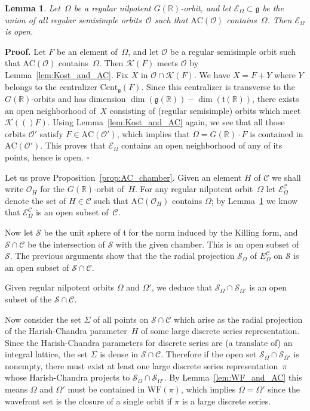 \documentclass[10pt,leqno]{article}
\newtheorem{lemma}[equation]{Lemma}
\newcommand{\qed}{\hfill $\square$ \medskip}
\newenvironment{proof}[1][Proof]{\noindent\textbf{#1.} }{\qed}
\newcommand{\R}{\mathbb R}
\renewcommand{\t}{\mathfrak t}
\newcommand{\g}{\mathfrak g}
\newcommand{\WF}{\mathrm{WF}}
\newcommand{\AC}{\mathrm{AC}}
\newcommand{\Kostant}[1]{\mathcal{K}(#1)}
\newcommand{\ECom}{\mathcal{E}^{\mathcal{C}}_\Omega}
\begin{document}
\begin{lemma}\label{lem:AC_containment} Let~$\Omega$ be a regular nilpotent $G(\R)$-orbit, and let $\mathcal{E}_\Omega \subset \g$ be the union of all regular semisimple orbits~$\mathcal{O}$ such that $\AC(\mathcal{O})$ contains~$\Omega$. Then $\mathcal{E}_\Omega$ is open. 
\end{lemma}

\begin{proof}
Let $F$ be an element of~$\Omega$, and let $\mathcal{O}$  be a regular semisimple orbit such that $\AC(\mathcal{O})$ contains~$\Omega$.
Then $\Kostant{F}$ meets $\mathcal{O}$ by  Lemma~\ref{lem:Kost_and_AC}. 
Fix $X$ in $\mathcal{O} \cap \Kostant{F}$.
We have $X =F+Y$ where $Y$ belongs to the centralizer $\mathrm{Cent}_\g(F)$.
Since this centralizer is transverse to the $G(\R)$-orbits and has dimension $\dim(\g(\R))-\dim(\t(\R))$,
there exists an open neighborhood of~$X$ consisting of (regular semisimple) orbits  which meet $\Kostant(F)$.
Using Lemma~\ref{lem:Kost_and_AC} again, we see that all those orbits $\mathcal{O}'$ satisfy $F \in \AC(\mathcal{O}')$,
which implies that $\Omega = G(\R) \cdot F$ is contained in $\AC(\mathcal{O}')$.
This proves that $\mathcal{E}_\Omega$ contains an open neighborhood of any of its points, hence is open.   \end{proof}


Let us prove Proposition~\ref{prop:AC_chamber}. Given an element $H$ of $\mathcal{C}$ we shall write $\mathcal{O}_H$ for the $G(\R)$-orbit of~$H$. For any regular nilpotent orbit~$\Omega$ let $\ECom$  denote the set of $H \in \mathcal{C}$ such that $\AC(\mathcal{O}_H)$ contains $\Omega$; by Lemma~\ref{lem:AC_containment}  we know that   $\ECom$ is an open subset of~$\mathcal{C}$. 

Now let $\mathcal{S}$ be the unit sphere of $\t$ for the norm induced by the Killing form, and $\mathcal{S} \cap \mathcal{C}$ be the intersection of $\mathcal{S}$ with the given chamber. This is an open subset of $\mathcal{S}$. The previous arguments show that the the radial projection $\mathcal{S}_{\Omega}$ of  $E^{\mathcal{C}}_\Omega$ on $\mathcal{S}$ is an open subset of $\mathcal{S} \cap \mathcal{C}$. 

Given regular nilpotent orbits $\Omega$ and $\Omega'$, we deduce that $\mathcal{S}_\Omega \cap \mathcal{S}_{\Omega'}$ is an open subset of the $\mathcal{S} \cap \mathcal{C}$.

Now consider the set $\Sigma$ of all points on $\mathcal{S} \cap \mathcal{C}$ which arise as the radial projection of the Harish-Chandra parameter~$H$ of some large discrete series representation. Since the Harish-Chandra parameters for discrete series are (a translate of) an integral lattice, the set $\Sigma$ is dense in $\mathcal{S} \cap \mathcal{C}$. Therefore if the open set $\mathcal{S}_\Omega \cap \mathcal{S}_{\Omega'}$ is nonempty, there must exist at least one large discrete series representation~$\pi$ whose Harish-Chandra projects to $\mathcal{S}_\Omega \cap \mathcal{S}_{\Omega'}$. By Lemma~\ref{lem:WF_and_AC} this means $\Omega$ and $\Omega'$ must be contained in $\WF(\pi)$, which implies $\Omega = \Omega'$ since the wavefront set is the closure of a single orbit if $\pi$ is a large discrete series. 
\end{document}
